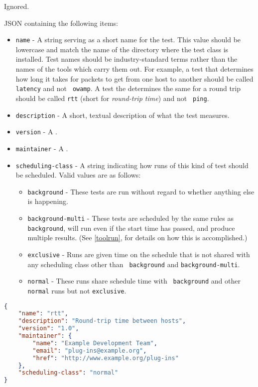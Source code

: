 \documentclass[10pt,titlepage]{article}
\begin{document}
 Ignored.

 JSON containing the following items:
\begin{itemize}
\item{\tt name} - A string serving as a short name for the test.  This
  value should be lowercase and match the name of the directory where
  the test class is installed.  Test names should be industry-standard
  terms rather than the names of the tools which carry them out.  For
  example, a test that determines how long it takes for packets to get
  from one host to another should be called {\tt latency} and not {\tt
    owamp}.  A test the determines the same for a round trip should be
  called {\tt rtt} (short for {\it round-trip time}) and not {\tt
    ping}.
\item{\tt description} - A short, textual description of what the test
  measures.
\item{\tt version} - A .
\item{\tt maintainer} - A .
\item{\tt scheduling-class} - A string indicating how runs of this
  kind of test should be scheduled.  Valid values are as follows:
  \begin{itemize}
  \item {\tt background} - These tests are run without regard to
    whether anything else is happening.
  \item {\tt background-multi} - These tests are scheduled by the same
    rules as {\tt background}, will run even if the start time has
    passed, and produce multiple results.  (See \autoref{toolrun},
    {\it {}} for details on how this is accomplished.)
  \item {\tt exclusive} - Runs are given time on the schedule
    that is not shared with any scheduling class other than {\tt
      background} and {\tt background-multi}.
  \item {\tt normal} - These runs share schedule time with {\tt
    background} and other {\tt normal} runs but not {\tt exclusive}.
  \end{itemize}
\end{itemize}

\example
\begin{lstlisting}[language=json,firstnumber=1]
{
    "name": "rtt",
    "description": "Round-trip time between hosts",
    "version": "1.0",
    "maintainer": {
        "name": "Example Development Team",
        "email": "plug-ins@example.org",
        "href": "http://www.example.org/plug-ins"
    },
    "scheduling-class": "normal"
}
\end{lstlisting}
\end{document}
